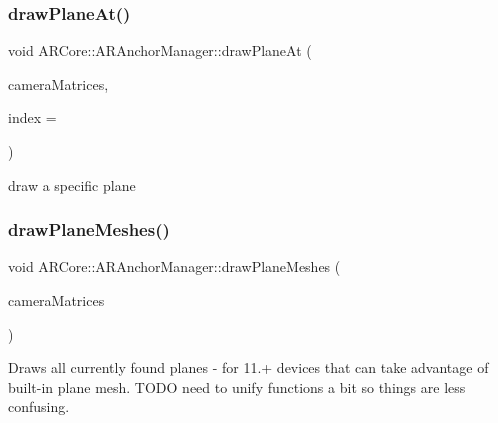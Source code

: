 \mbox{\label{class_a_r_core_1_1_a_r_anchor_manager_a68742132d494088fcf6be20c776ca0c6}} 
\subsubsection{\texorpdfstring{draw\+Plane\+At()}{drawPlaneAt()}}
{\footnotesize\ttfamily void A\+R\+Core\+::\+A\+R\+Anchor\+Manager\+::draw\+Plane\+At (\begin{DoxyParamCaption}\item[{\mbox{\hyperlink{struct_a_r_common_1_1_a_r_camera_matrices}{A\+R\+Common\+::\+A\+R\+Camera\+Matrices}}}]{camera\+Matrices,  }\item[{int}]{index = {} }\end{DoxyParamCaption})}



draw a specific plane 

\mbox{\label{class_a_r_core_1_1_a_r_anchor_manager_a84a5f1c8b7fbe62c32aa901f2c97d612}} 
\subsubsection{\texorpdfstring{draw\+Plane\+Meshes()}{drawPlaneMeshes()}}
{\footnotesize\ttfamily void A\+R\+Core\+::\+A\+R\+Anchor\+Manager\+::draw\+Plane\+Meshes (\begin{DoxyParamCaption}\item[{\mbox{\hyperlink{struct_a_r_common_1_1_a_r_camera_matrices}{A\+R\+Common\+::\+A\+R\+Camera\+Matrices}}}]{camera\+Matrices }\end{DoxyParamCaption})}

Draws all currently found planes -\/ for 11.+ devices that can take advantage of built-\/in plane mesh. T\+O\+DO need to unify functions a bit so things are less confusing. \mbox{\label{class_a_r_core_1_1_a_r_anchor_manager_a7ec2178e8754fa04b00cc600c60cb852}} 
